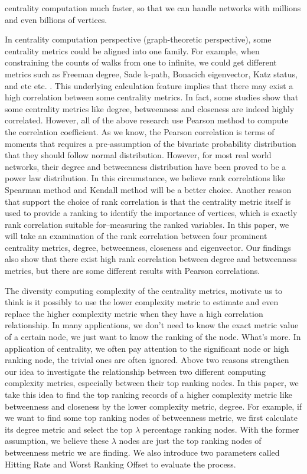 \documentclass[symmetry,article,submit,moreauthors,pdftex,10pt,a4paper]{Definitions/mdpi}
\makeatletter
\newcommand*{\etc}{%
    \@ifnextchar{.}%
        {etc}%
        {etc.\@\xspace}%
}
\makeatother
\begin{document}
centrality computation much faster, so that we can handle networks with millions and even billions of vertices.

In centrality computation perspective (graph-theoretic perspective\cite{borgatti2006graph}), some centrality metrics could be aligned into one family. For example, when constraining the counts of walks from one to infinite, we could get different metrics such as Freeman degree, Sade k-path, Bonacich eigenvector, Katz status, and \etc. This underlying calculation feature implies that there may exist a high correlation between some centrality metrics. In fact, some studies\cite{li2015correlation, lee2006correlations } show that  some centrality metrics like degree, betweenness and closeness are indeed highly correlated. However, all of the above research use Pearson method to compute the correlation coefficient. As we know, the Pearson correlation is terms of moments that requires a pre-assumption of the bivariate probability distribution that  they should follow normal distribution. However, for most real world networks, their degree and betweenness distribution have been proved to be a power law distribution.  In this circumstance, we believe rank correlations like Spearman method and Kendall method will be a better choice. Another reason that support the choice of rank correlation is that the centrality metric itself is used to provide a ranking to identify the importance of vertices, which is exactly rank correlation suitable for--measuring the ranked variables.   In this paper, we will take an examination of the rank correlation between four prominent centrality metrics, degree, betweenness, closeness and eigenvector. Our findings also show that there exist high rank correlation between degree and betweenness metrics, but there are some different results with Pearson correlations.

The diversity computing complexity of the centrality metrics, motivate us to think is it possibly to use the lower complexity metric to estimate and even replace the higher complexity metric when they have a high correlation relationship. In many applications, we don't need to know the exact metric value of a certain node, we just want to know the ranking of the node. What's more. In application of centrality, we often pay attention to the significant node or high ranking node, the trivial ones are often ignored. Above two reasons strengthen our idea to investigate the relationship between two different computing complexity metrics, especially between their top ranking nodes. In this paper, we take this idea to find the top ranking records of a higher complexity metric like betweenness and closeness by the lower complexity metric, degree. For example, if we want to find some top ranking nodes of betweenness metric, we first calculate its degree metric and select the top $\lambda$ percentage ranking nodes. With the former assumption, we believe these $\lambda$ nodes are just the top ranking nodes of betweenness metric we are finding. We also introduce two parameters called Hitting Rate and Worst Ranking Offset to evaluate the process.
\end{document}
